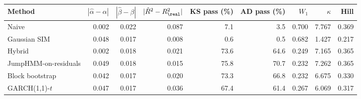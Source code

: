 \begin{tabular}{lrrrrrrrr}
\toprule
Method & $|\hat\alpha-\alpha|$ & $|\hat\beta-\beta|$ & $|\hat R^2 - R^2_{\real}|$ & KS pass (\%) & AD pass (\%) & $W_1$ & $\kappa$ & Hill \\
\midrule
Naive & 0.002 & 0.022 & 0.087 & 7.1 & 3.5 & 0.700 & 7.767 & 0.369 \\
Gaussian SIM & 0.048 & 0.017 & 0.008 & 0.6 & 0.5 & 0.682 & 1.427 & 0.217 \\
Hybrid & 0.002 & 0.018 & 0.021 & 73.6 & 64.6 & 0.249 & 7.165 & 0.365 \\
JumpHMM-on-residuals & 0.049 & 0.018 & 0.015 & 75.8 & 70.7 & 0.232 & 7.262 & 0.365 \\
Block bootstrap & 0.042 & 0.017 & 0.020 & 73.3 & 66.8 & 0.232 & 6.675 & 0.330 \\
GARCH(1,1)-$t$ & 0.047 & 0.017 & 0.036 & 67.4 & 61.4 & 0.267 & 6.069 & 0.317 \\
\bottomrule
\end{tabular}
